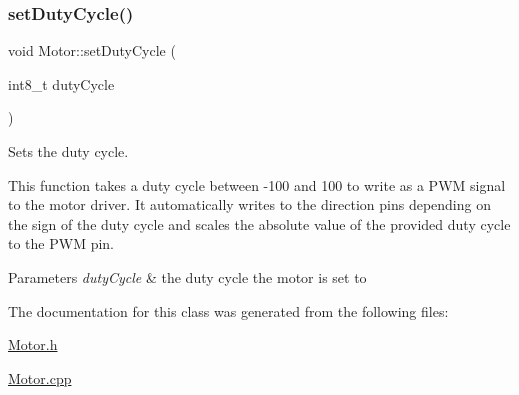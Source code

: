 \subsubsection{\texorpdfstring{set\+Duty\+Cycle()}{setDutyCycle()}}
{\footnotesize\ttfamily void Motor\+::set\+Duty\+Cycle (\begin{DoxyParamCaption}\item[{int8\+\_\+t}]{duty\+Cycle }\end{DoxyParamCaption})}



Sets the duty cycle. 

This function takes a duty cycle between -\/100 and 100 to write as a P\+WM signal to the motor driver. It automatically writes to the direction pins depending on the sign of the duty cycle and scales the absolute value of the provided duty cycle to the P\+WM pin. 
\begin{DoxyParams}{Parameters}
{\em duty\+Cycle} & the duty cycle the motor is set to \\
\hline
\end{DoxyParams}


The documentation for this class was generated from the following files\+:\begin{DoxyCompactItemize}
\item 
\mbox{\hyperlink{_motor_8h}{Motor.\+h}}\item 
\mbox{\hyperlink{_motor_8cpp}{Motor.\+cpp}}\end{DoxyCompactItemize}
